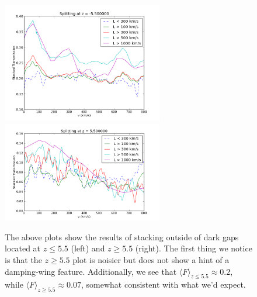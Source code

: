 \documentclass[11pt]{article}
\begin{document}
\begin{figure}[h]
  \centering
  \includegraphics[width=7cm]{Stack_Zlessthan5p5.png}
  \includegraphics[width=7cm]{Stack_Zgreaterthan5p5.png}
  \caption{The above plots show the results of stacking outside of dark gaps located at $z \leq 5.5$ (left) and $z \geq 5.5$ (right). The first thing we notice is that the $z \geq 5.5$ plot is noisier but does not show a hint of a damping-wing feature. Additionally, we see that $\langle F \rangle_{z\leq 5.5} \approx 0.2$, while $\langle F \rangle_{z\geq 5.5} \approx 0.07$, somewhat consistent with what we'd expect.}
  \label{fig:z5p5}
\end{figure}
\end{document}
